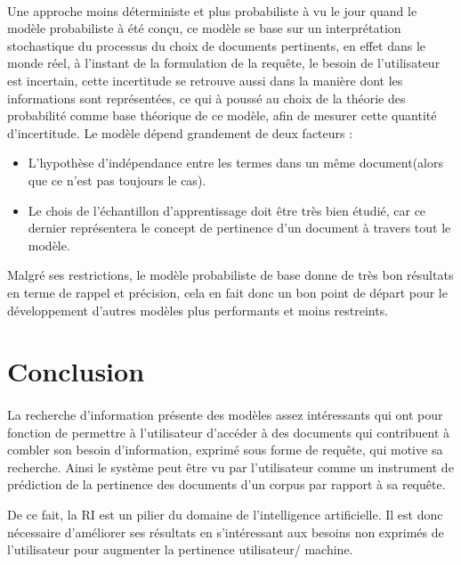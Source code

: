 \documentclass[12pt]{report}
\begin{document}
	\paragraph{}
	Une approche moins déterministe et plus probabiliste à vu le jour quand le 
	modèle probabiliste à été conçu, ce modèle se base sur un interprétation 
	stochastique du processus du choix de documents pertinents, en effet dans le
	monde réel, à l'instant de la formulation de la requête, le besoin de l'utilisateur
	est incertain, cette incertitude se retrouve aussi dans la manière dont
	les informations sont représentées, ce qui à poussé au choix de la théorie 
	des probabilité comme base théorique de ce modèle, afin de mesurer cette 
	quantité d'incertitude. Le modèle dépend grandement de deux facteurs : 
	\begin{itemize}
		\item L'hypothèse d'indépendance entre les termes dans un même document(alors 
		que ce n'est pas toujours le cas).
		\item Le chois de l'échantillon d'apprentissage doit être très bien étudié, car
		ce dernier représentera le concept de pertinence d'un document à travers
		tout le modèle.
	\end{itemize}
	Malgré ses restrictions, le modèle probabiliste de base donne de très bon résultats
	en terme de rappel et précision, cela en fait donc un bon point de départ pour
	le développement d'autres modèles plus performants et moins restreints.
	
	\section{Conclusion}
	\paragraph{}
	La recherche d’information présente des modèles assez intéressants qui ont pour fonction
	de permettre à l'utilisateur d'accéder à des documents qui contribuent à combler son besoin
	d'information, exprimé sous forme de requête, qui motive sa recherche. Ainsi le système
	peut être vu par l’utilisateur comme un instrument de prédiction de la pertinence des
	documents d’un corpus par rapport à sa requête.
	\par 
	De ce fait, la RI est un pilier du domaine de l’intelligence artificielle. Il est donc
	nécessaire d’améliorer ses résultats en s’intéressant aux besoins non exprimés de
	l’utilisateur pour augmenter la pertinence utilisateur/ machine.
	


\end{document}
